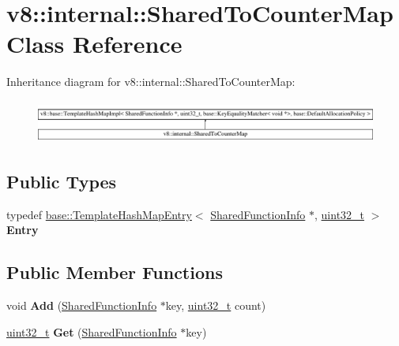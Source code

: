 \hypertarget{classv8_1_1internal_1_1SharedToCounterMap}{}\section{v8\+:\+:internal\+:\+:Shared\+To\+Counter\+Map Class Reference}
\label{classv8_1_1internal_1_1SharedToCounterMap}
Inheritance diagram for v8\+:\+:internal\+:\+:Shared\+To\+Counter\+Map\+:\begin{figure}[H]
\begin{center}
\leavevmode
\includegraphics[height=1.432225cm]{classv8_1_1internal_1_1SharedToCounterMap}
\end{center}
\end{figure}
\subsection*{Public Types}
\begin{DoxyCompactItemize}
\item 
\mbox{\label{classv8_1_1internal_1_1SharedToCounterMap_a99f3d68a220df067a8946c0aff919441}} 
typedef \mbox{\hyperlink{structv8_1_1base_1_1TemplateHashMapEntry}{base\+::\+Template\+Hash\+Map\+Entry}}$<$ \mbox{\hyperlink{classv8_1_1internal_1_1SharedFunctionInfo}{Shared\+Function\+Info}} $\ast$, \mbox{\hyperlink{classuint32__t}{uint32\+\_\+t}} $>$ {\bfseries Entry}
\end{DoxyCompactItemize}
\subsection*{Public Member Functions}
\begin{DoxyCompactItemize}
\item 
\mbox{\label{classv8_1_1internal_1_1SharedToCounterMap_a5458eb7d2624ddb825b4fa17bc14e62e}} 
void {\bfseries Add} (\mbox{\hyperlink{classv8_1_1internal_1_1SharedFunctionInfo}{Shared\+Function\+Info}} $\ast$key, \mbox{\hyperlink{classuint32__t}{uint32\+\_\+t}} count)
\item 
\mbox{\label{classv8_1_1internal_1_1SharedToCounterMap_a712afe63cc389aa819e988ec112f118b}} 
\mbox{\hyperlink{classuint32__t}{uint32\+\_\+t}} {\bfseries Get} (\mbox{\hyperlink{classv8_1_1internal_1_1SharedFunctionInfo}{Shared\+Function\+Info}} $\ast$key)
\end{DoxyCompactItemize}
